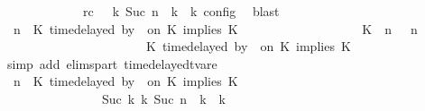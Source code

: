 \begin{isabellebody}
\ \ \ \ \ \ \ \ \ \ \ \ \ rc{\isacharcolon}{\isacartoucheopen}{\isasymrho}\ {\isasymin}\ {\isasymlbrakk}\ {\isasymGamma}\isactrlsub k{\isacharcomma}\ Suc\ n\ {\isasymturnstile}\ {\isasymPsi}\isactrlsub k\ {\isasymtriangleright}\ {\isasymPhi}\isactrlsub k\ {\isasymrbrakk}\isactrlsub c\isactrlsub o\isactrlsub n\isactrlsub f\isactrlsub i\isactrlsub g{\isacartoucheclose}\ \isamarkupfalse%
\ blast\isanewline
\ \ \ \ \ \ \ \ \isamarkupfalse%
\ {\isacartoucheopen}{\isacharparenleft}{\isasymGamma}{\isacharcomma}\ n\ {\isasymturnstile}\ {\isacharparenleft}{\isacharparenleft}K\ time{\isacharminus}delayed{\isasymsharp}\ by\ {\isasymdelta}{\isasymtau}\ on\ K\ implies\ K\ {\isacharhash}\ {\isasymPsi}{\isacharparenright}\ {\isasymtriangleright}\ {\isasymPhi}{\isacharparenright}\isanewline
\ \ \ \ \ \ \ \ \ \ \ \ \ \ {\isasymhookrightarrow}\ {\isacharparenleft}{\isacharparenleft}{\isacharparenleft}K\ {\isasymnot}{\isasymUp}\ n{\isacharparenright}\ {\isacharhash}\ {\isasymGamma}{\isacharparenright}{\isacharcomma}\ n\isanewline
\ \ \ \ \ \ \ \ \ \ \ \ \ \ \ \ \ \ \ \ {\isasymturnstile}\ {\isasymPsi}\ {\isasymtriangleright}\ {\isacharparenleft}{\isacharparenleft}K\ time{\isacharminus}delayed{\isasymsharp}\ by\ {\isasymdelta}{\isasymtau}\ on\ K\ implies\ K\ {\isacharhash}\ {\isasymPhi}{\isacharparenright}{\isacharparenright}{\isacartoucheclose}\isanewline
\ \ \ \ \ \ \ \ \ \ \isamarkupfalse%
\ {\isacharparenleft}simp\ add{\isacharcolon}\ elims{\isacharunderscore}part\ timedelayed{\isacharunderscore}tvar{\isacharunderscore}e{}{\isacharparenright}\isanewline
\ \ \ \ \ \ \ \ \isamarkupfalse%
\ {\isacartoucheopen}{\isacharparenleft}{\isasymGamma}{\isacharcomma}\ n\ {\isasymturnstile}\ {\isacharparenleft}{\isacharparenleft}K\ time{\isacharminus}delayed{\isasymsharp}\ by\ {\isasymdelta}{\isasymtau}\ on\ K\ implies\ K\ {\isacharhash}\ {\isasymPsi}{\isacharparenright}\ {\isasymtriangleright}\ {\isasymPhi}{\isacharparenright}\isanewline
\ \ \ \ \ \ \ \ \ \ \ \ \ \ \ \ {\isasymhookrightarrow}\isactrlbsup Suc\ k\isactrlesup \ {\isacharparenleft}{\isasymGamma}\isactrlsub k{\isacharcomma}\ Suc\ n\ {\isasymturnstile}\ {\isasymPsi}\isactrlsub k\ {\isasymtriangleright}\ {\isasymPhi}\isactrlsub k{\isacharparenright}{\isacartoucheclose}\isanewline

\end{isabellebody}
